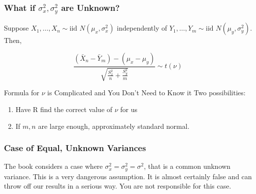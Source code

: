 \documentclass[handout]{beamer}
\begin{document}
\begin{frame}
\frametitle{What if $\sigma_x^2,\sigma_y^2$ are Unknown?}
Suppose $X_1, \hdots, X_{n} \sim \mbox{iid } N(\mu_x, \sigma^2_x)$ independently of $Y_1, \hdots, Y_{m} \sim \mbox{iid } N(\mu_y, \sigma^2_y)$. Then,

\vspace{1em}
$$\frac{\left(\bar{X}_n - \bar{Y}_m\right) - (\mu_x - \mu_y)}{\sqrt{\displaystyle\frac{S_x^2}{n} + \frac{S_y^2}{m} }}\sim t(\nu)$$
\vspace{1em}

\begin{block}{Formula for $\nu$ is Complicated and You Don't Need to Know it}
Two possibilities:
	\begin{enumerate}
		\item Have R find the correct value of $\nu$ for us
		\item If $m,n$ are large enough, approximately standard normal. 
	\end{enumerate}
\end{block}

\end{frame}
\begin{frame}
\frametitle{Case of Equal, Unknown Variances}

The book considers a case where $\sigma^2_x = \sigma^2_y = \sigma^2$, that is a common unknown variance. This is a \alert{very dangerous assumption}. It is almost certainly false and can throw off our results in a serious way. You are not responsible for this case.
\end{frame}
\end{document}
